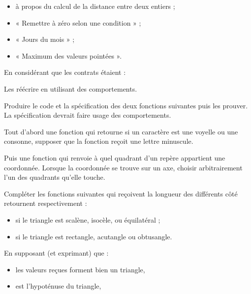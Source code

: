 \begin{itemize}
\item à propos du calcul de la distance entre deux entiers ;
\item « Remettre à zéro selon une condition » ;
\item « Jours du mois » ;
\item « Maximum des valeurs pointées ».
\end{itemize}


En considérant que les contrats étaient :




Les réécrire en utilisant des comportements.




Produire le code et la spécification des deux fonctions suivantes puis
les prouver. La spécification devrait faire usage des comportements.


Tout d'abord une fonction qui retourne si un caractère est une voyelle
ou une consonne, supposer que la fonction reçoit une lettre minuscule.




Puis une fonction qui renvoie à quel quadrant d'un repère appartient
une coordonnée. Lorsque la coordonnée se trouve sur un axe, choisir
arbitrairement l'un des quadrants qu'elle touche.






Compléter les fonctions suivantes qui reçoivent la longueur des différents
côté retournent respectivement :


\begin{itemize}
\item si le triangle est scalène, isocèle, ou équilatéral ;
\item si le triangle est rectangle, acutangle ou obtusangle.
\end{itemize}




En supposant (et exprimant) que :


\begin{itemize}
\item les valeurs reçues forment bien un triangle,
\item {} est l'hypoténuse du triangle,
\end{itemize}


